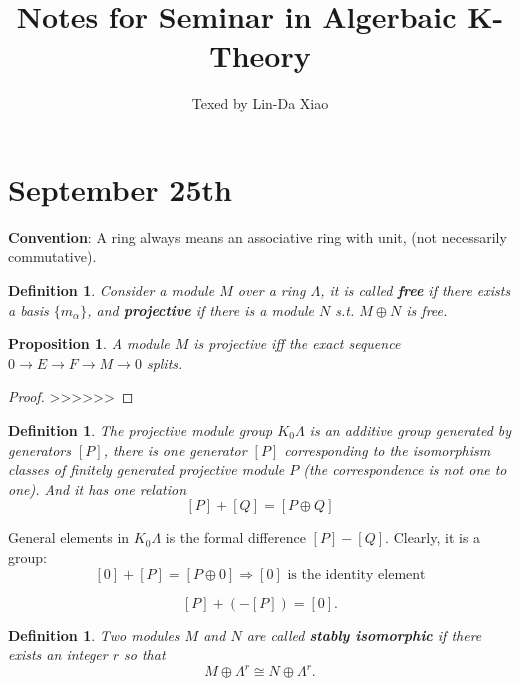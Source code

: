 \documentclass[11pt]{article}
\title{\bf Notes for Seminar in Algerbaic K-Theory}
\author{Texed by Lin-Da Xiao} %
\newtheorem{prop}[thm]{Proposition}
\newtheorem{dfn}[thm]{Definition}
\begin{document}
\maketitle
\tableofcontents
\newpage
\section{September 25th}
\textbf{Convention}: A ring always means an associative ring with unit, (not necessarily commutative).
\begin{dfn}
Consider a module $M$ over a ring $\Lambda$, it is called \textbf{free} if there exists a basis $\{m_\alpha\}$, and \textbf{projective} if there is a module $N$ s.t. $M\oplus N$ is free.
\end{dfn}
\begin{prop}
A module $M$ is projective iff the exact sequence $0\rightarrow E\rightarrow F\rightarrow M\rightarrow 0$ splits.
\end{prop}
\begin{proof}
>>>>>>
\end{proof}
\begin{dfn}
The projective module group $K_0\Lambda$ is an additive group generated by generators  $[P]$, there is one generator $[P]$ corresponding to the isomorphism classes of finitely generated projective module $P$ (the correspondence is not one to one). And it has one relation 
$$
[P]+[Q]=[P\oplus Q]
$$
\end{dfn}
General elements in $K_0\Lambda$ is the formal difference $[P]-[Q]$. Clearly, it is a group:
$$
[0]+[P]=[P\oplus0]\Longrightarrow [0]\text{ is the identity element}
$$

$$
[P]+(-[P])=[0].
$$
\begin{dfn}
Two modules $M$ and $N$ are called \textbf{stably isomorphic} if there exists an integer $r$ so that 
$$
M\oplus \Lambda^r\cong N\oplus \Lambda^r.
$$
\end{dfn}
\end{document}
